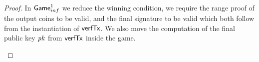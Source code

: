 \begin{proof}
    In $\mathsf{Game}_{inf}^{1}$ we reduce the winning condition, we require the range proof of the output coins to be valid, and the final signature to be valid which both follow from the instantiation of $\mathsf{verfTx}$.
    We also move the computation of the final public key $\mathit{pk}$ from $\mathsf{verfTx}$ inside the game.

    \begin{center}
    \end{center}


\end{proof}
